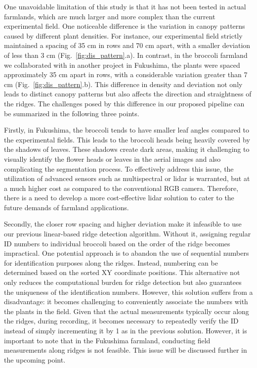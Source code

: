   One unavoidable limitation of this study is that it has not been tested in actual farmlands, which are much larger and more complex than the current experimental field. 
  One noticeable difference is the variation in canopy patterns caused by different plant densities.
  For instance, our experimental field strictly maintained a spacing of 35 cm in rows and 70 cm apart, with a smaller deviation of less than 3 cm (Fig.~\ref{fig:dis_pattern}.a).
  In contrast, in the broccoli farmland we collaborated with in another project in Fukushima, the plants were spaced approximately 35 cm apart in rows, with a considerable variation greater than 7 cm (Fig.~\ref{fig:dis_pattern}.b). 
  This difference in density and deviation not only leads to distinct canopy patterns but also affects the direction and straightness of the ridges.
  The challenges posed by this difference in our proposed pipeline can be summarized in the following three points.





  Firstly, in Fukushima, the broccoli tends to have smaller leaf angles compared to the experimental fields. 
  This leads to the broccoli heads being heavily covered by the shadows of leaves. 
  These shadows create dark areas, making it challenging to visually identify the flower heads or leaves in the aerial images and also complicating the segmentation process. 
  To effectively address this issue, the utilization of advanced sensors such as multispectral or \gls{lidar} is warranted, but at a much higher cost as compared to the conventional RGB camera. Therefore, there is a need to develop a more cost-effective \gls{lidar} solution to cater to the future demands of farmland applications.

  Secondly, the closer row spacing and higher deviation make it infeasible to use our previous linear-based ridge detection algorithm. 
  Without it, assigning regular ID numbers to individual broccoli based on the order of the ridge becomes impractical.
  One potential approach is to abandon the use of sequential numbers for identification purposes along the ridges. 
  Instead, numbering can be determined based on the sorted XY coordinate positions. This alternative not only reduces the computational burden for ridge detection but also guarantees the uniqueness of the identification numbers. 
  However, this solution suffers from a disadvantage: 
  it becomes challenging to conveniently associate the numbers with the plants in the field. 
  Given that the actual measurements typically occur along the ridges, during recording, it becomes necessary to repeatedly verify the ID instead of simply incrementing it by 1 as in the previous solution.
  However, it is important to note that in the Fukushima farmland, conducting field measurements along ridges is not feasible. This issue will be discussed further in the upcoming point.

